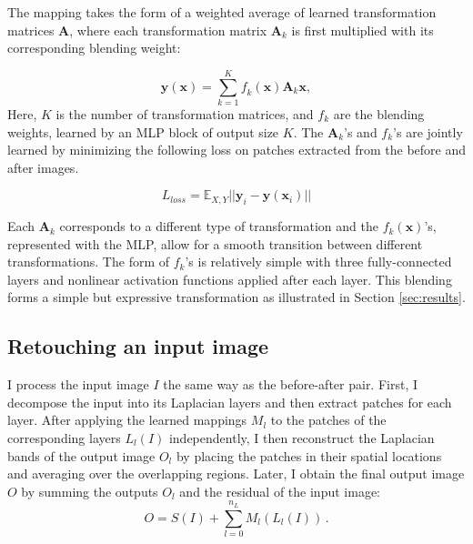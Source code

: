 The mapping takes the form of a weighted average of learned transformation matrices $\mathbf{A}$, where each transformation matrix $\mathbf{A}_k$ is first multiplied with its corresponding blending weight: 

\begin{equation} 
	\mathbf{y} (\mathbf{x}) = \sum_{k=1}^K
	\mathit{f}_k (\mathbf{x}) \mathbf{A}_k \mathbf{x},
	\label{eq:weightedSum}
\end{equation} 
Here, $K$ is the number of transformation matrices, and $f_k$ are the blending weights, learned by an MLP block of output size $K$. The $\mathbf{A}_k$'s and $f_k$'s are jointly learned by minimizing the following loss on patches extracted from the before and after images.

\begin{equation}
    L_{loss}  = \mathbb{E}_{X, Y} || \mathbf{y}_i -   \mathbf{y} (\mathbf{x}_i) ||
\end{equation}

Each $\mathbf{A}_k$ corresponds to a different type of transformation and the $f_k(\mathbf{x})$'s, represented with the MLP, allow for a smooth transition between different transformations. The form of $f_k$'s is relatively simple with three fully-connected layers and nonlinear activation functions applied after each layer. This blending forms a simple but expressive transformation as illustrated in Section \ref{sec:results}.


\subsection{Retouching an input image}

I process the input image $I$ the same way as the before-after pair. First, I decompose the input into its Laplacian layers and then extract patches for each layer. After applying the learned mappings $M_l$ to the patches of the corresponding layers $L_{l}(I)$ independently, I then reconstruct the Laplacian bands of the output image $O_l$ by placing the patches in their spatial locations and averaging over the overlapping regions. Later, I obtain the final output image $O$ by summing the outputs $O_l$ and the residual of the input image:
\begin{equation}
    O = S(I) + \sum_{l=0}^{n_L} M_l(L_l(I))\,.
\end{equation}

